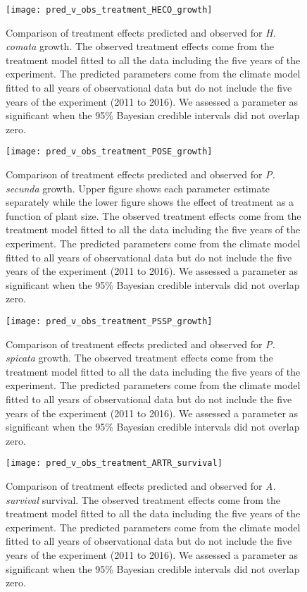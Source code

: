 \documentclass[11pt]{article}
\begin{document}
\begin{figure}[!htbp]
	\centering
	\texttt{[image: pred\_v\_obs\_treatment\_HECO\_growth]}
	\caption{Comparison of treatment effects predicted and observed for \textit{H. comata} growth.  The observed treatment effects come from the treatment model fitted to all the data including the five years of the experiment.  The predicted parameters come from the climate model fitted to all years of observational data but do not include the five years of the experiment (2011 to 2016). We assessed a parameter as significant when the 95\% Bayesian credible intervals did not overlap zero.}
	\label{fig:parPredHECOGrowth}
\end{figure}

\begin{figure}[!htbp]
	\centering
	\texttt{[image: pred\_v\_obs\_treatment\_POSE\_growth]}
	\caption{Comparison of treatment effects predicted and observed for \textit{P. secunda} growth.  Upper figure shows each parameter estimate separately while the lower figure shows the effect of treatment as a function of plant size.  The observed treatment effects come from the treatment model fitted to all the data including the five years of the experiment.  The predicted parameters come from the climate model fitted to all years of observational data but do not include the five years of the experiment (2011 to 2016). We assessed a parameter as significant when the 95\% Bayesian credible intervals did not overlap zero.}
	\label{fig:parPredPOSEGrowth}
\end{figure}


\begin{figure}[!htbp]
	\centering
	\texttt{[image: pred\_v\_obs\_treatment\_PSSP\_growth]}
	\caption{Comparison of treatment effects predicted and observed for \textit{P. spicata} growth.  The observed treatment effects come from the treatment model fitted to all the data including the five years of the experiment.  The predicted parameters come from the climate model fitted to all years of observational data but do not include the five years of the experiment (2011 to 2016). We assessed a parameter as significant when the 95\% Bayesian credible intervals did not overlap zero.}
	\label{fig:parPredPSSPGrowth}
\end{figure}


\begin{figure}[!htbp]
	\centering
	\texttt{[image: pred\_v\_obs\_treatment\_ARTR\_survival]}
	\caption{Comparison of treatment effects predicted and observed for \textit{A. survival} survival.  The observed treatment effects come from the treatment model fitted to all the data including the five years of the experiment.  The predicted parameters come from the climate model fitted to all years of observational data but do not include the five years of the experiment (2011 to 2016). We assessed a parameter as significant when the 95\% Bayesian credible intervals did not overlap zero.}
	\label{fig:parPredARTRSurvival}
\end{figure}
\end{document}

